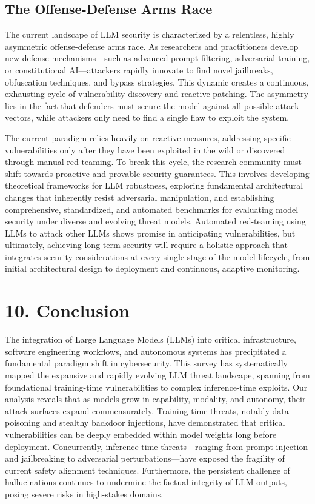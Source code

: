 \documentclass[11pt,a4paper]{article}
\begin{document}
\subsection{The Offense-Defense Arms Race}
The current landscape of LLM security is characterized by a relentless, highly asymmetric offense-defense arms race. As researchers and practitioners develop new defense mechanisms---such as advanced prompt filtering, adversarial training, or constitutional AI---attackers rapidly innovate to find novel jailbreaks, obfuscation techniques, and bypass strategies. This dynamic creates a continuous, exhausting cycle of vulnerability discovery and reactive patching. The asymmetry lies in the fact that defenders must secure the model against all possible attack vectors, while attackers only need to find a single flaw to exploit the system.

The current paradigm relies heavily on reactive measures, addressing specific vulnerabilities only after they have been exploited in the wild or discovered through manual red-teaming. To break this cycle, the research community must shift towards proactive and provable security guarantees. This involves developing theoretical frameworks for LLM robustness, exploring fundamental architectural changes that inherently resist adversarial manipulation, and establishing comprehensive, standardized, and automated benchmarks for evaluating model security under diverse and evolving threat models. Automated red-teaming using LLMs to attack other LLMs shows promise in anticipating vulnerabilities, but ultimately, achieving long-term security will require a holistic approach that integrates security considerations at every single stage of the model lifecycle, from initial architectural design to deployment and continuous, adaptive monitoring.

\section{10. Conclusion}

The integration of Large Language Models (LLMs) into critical infrastructure, software engineering workflows, and autonomous systems has precipitated a fundamental paradigm shift in cybersecurity. This survey has systematically mapped the expansive and rapidly evolving LLM threat landscape, spanning from foundational training-time vulnerabilities to complex inference-time exploits. Our analysis reveals that as models grow in capability, modality, and autonomy, their attack surfaces expand commensurately. Training-time threats, notably data poisoning and stealthy backdoor injections, have demonstrated that critical vulnerabilities can be deeply embedded within model weights long before deployment. Concurrently, inference-time threats---ranging from prompt injection and jailbreaking to adversarial perturbations---have exposed the fragility of current safety alignment techniques. Furthermore, the persistent challenge of hallucinations continues to undermine the factual integrity of LLM outputs, posing severe risks in high-stakes domains.
\end{document}
